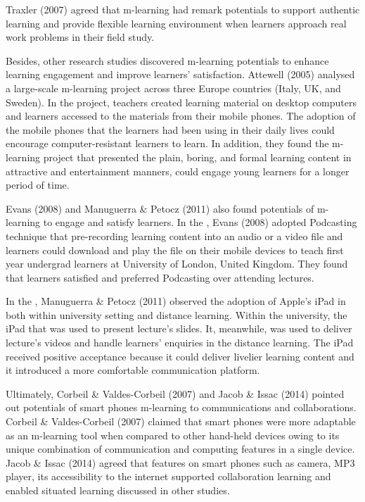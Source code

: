 Traxler (2007) \cite{traxler2007defining} agreed that m-learning had remark potentials to support  authentic learning and provide flexible learning environment when learners approach real work problems in their field study. 

Besides, other research studies discovered m-learning potentials to enhance learning engagement and improve learners' satisfaction. Attewell (2005) \cite{attewell2005research} analysed a large-scale m-learning project across three Europe countries (Italy, UK, and Sweden). In the project, teachers created learning material on desktop computers and learners accessed to the materials from their mobile phones. The adoption of the mobile phones that the learners had been using in their daily lives could encourage computer-resistant learners to learn. In addition, they found the m-learning project that presented the plain, boring, and formal learning content  in attractive and entertainment manners, could engage young learners for a longer period of time. 

Evans (2008) \cite{evans2008effectiveness} and Manuguerra \& Petocz (2011) \cite{manuguerra2011promoting} also found potentials of m-learning to engage and satisfy learners. In the \cite{evans2008effectiveness}, Evans (2008) adopted Podcasting technique that pre-recording learning content into an audio or a video file and learners could download and play the file on their mobile devices to teach first year undergrad learners at University of London, United Kingdom. They found that learners satisfied and preferred Podcasting over attending lectures. 

In the \cite{manuguerra2011promoting}, Manuguerra \& Petocz (2011) observed the adoption of Apple's iPad in both within university setting and distance learning. Within the university, the iPad that was used to present lecture's slides. It, meanwhile, was used to deliver lecture's videos and handle learners' enquiries in the distance learning. The iPad received positive acceptance because it could deliver livelier learning content and it introduced a more comfortable communication platform. 

Ultimately, Corbeil \& Valdes-Corbeil (2007) \cite{corbeil2007you} and Jacob \& Issac (2014) \cite{jacob2014mobile} pointed out potentials of smart phones m-learning to communications and collaborations. Corbeil \& Valdes-Corbeil (2007) \cite{corbeil2007you} claimed that smart phones were more adaptable as an m-learning tool when compared to other hand-held devices owing to its unique combination of communication and computing features in a single device. Jacob \& Issac (2014) \cite{jacob2014mobile} agreed that features on smart phones such as camera, MP3 player, its accessibility to the internet supported collaboration learning and enabled situated learning discussed in other studies. 

